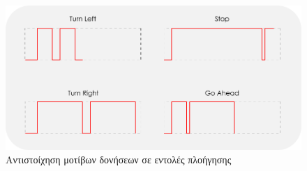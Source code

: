 \begin{figure}[H]
    \centering
    \includegraphics[width=\textwidth]{images/haptic_icons.png}
    \caption{Αντιστοίχηση μοτίβων δονήσεων σε εντολές πλοήγησης}
    \label{fig:haptic-icons}
\end{figure}


